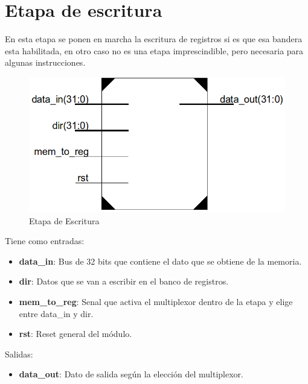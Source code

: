 \section {Etapa de escritura}

En esta etapa se ponen en marcha la escritura de registros si es que esa bandera esta habilitada, en otro caso no es una etapa imprescindible, pero necesaria para algunas instrucciones.

\begin{figure}[H]
\centering
\includegraphics[scale=0.5]{img/wb_stage}
\caption{Etapa de Escritura}
\label{fig:wb_stage}
\end{figure}

Tiene como entradas:
\begin{itemize}
  \item \textbf{data\_in}: Bus de 32 bits que contiene el dato que se obtiene de la memoria.
  \item \textbf{dir}: Datos que se van a escribir en el banco de registros.
  \item \textbf{mem\_to\_reg}: Senal que activa el multiplexor dentro de la etapa y elige entre data\_in y dir.
  \item \textbf{rst}: Reset general del m\'odulo.
\end{itemize}

Salidas:
\begin{itemize}
  \item \textbf{data\_out}: Dato de salida seg\'un la elecci\'on del multiplexor.
\end{itemize}